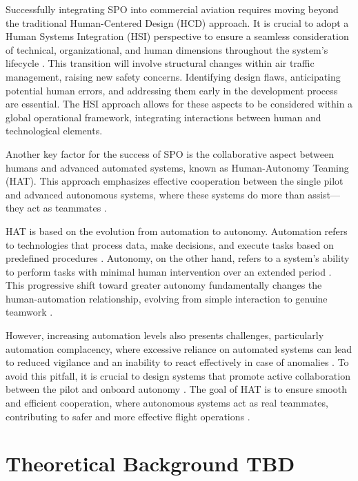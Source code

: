\documentclass[12pt,a4paper]{article} %
\begin{document}
	Successfully integrating SPO into commercial aviation requires moving beyond the traditional Human-Centered Design (HCD) approach. It is crucial to adopt a Human Systems Integration (HSI) perspective to ensure a seamless consideration of technical, organizational, and human dimensions throughout the system's lifecycle \parencite{boy_prodec_2024}. This transition will involve structural changes within air traffic management, raising new safety concerns. Identifying design flaws, anticipating potential human errors, and addressing them early in the development process are essential. The HSI approach allows for these aspects to be considered within a global operational framework, integrating interactions between human and technological elements.
	
	Another key factor for the success of SPO is the collaborative aspect between humans and advanced automated systems, known as Human-Autonomy Teaming (HAT). This approach emphasizes effective cooperation between the single pilot and advanced autonomous systems, where these systems do more than assist—they act as teammates \parencite{shively_autonomy_2017}.
	
	HAT is based on the evolution from automation to autonomy. Automation refers to technologies that process data, make decisions, and execute tasks based on predefined procedures \parencite{hoff_trust_2015, hancock_imposing_2017}. Autonomy, on the other hand, refers to a system's ability to perform tasks with minimal human intervention over an extended period \parencite{endsley_here_2017, holbrook_enabling_2020}. This progressive shift toward greater autonomy fundamentally changes the human-automation relationship, evolving from simple interaction to genuine teamwork \parencite{endsley_here_2017}.
	
	However, increasing automation levels also presents challenges, particularly automation complacency, where excessive reliance on automated systems can lead to reduced vigilance and an inability to react effectively in case of anomalies \parencite{lee_design_2023}. To avoid this pitfall, it is crucial to design systems that promote active collaboration between the pilot and onboard autonomy \parencite{endsley_here_2017}. The goal of HAT is to ensure smooth and efficient cooperation, where autonomous systems act as real teammates, contributing to safer and more effective flight operations \parencite{mcneese_chapter_2020}.
	
	\section{Theoretical Background \textbf{TBD}}
\end{document}
